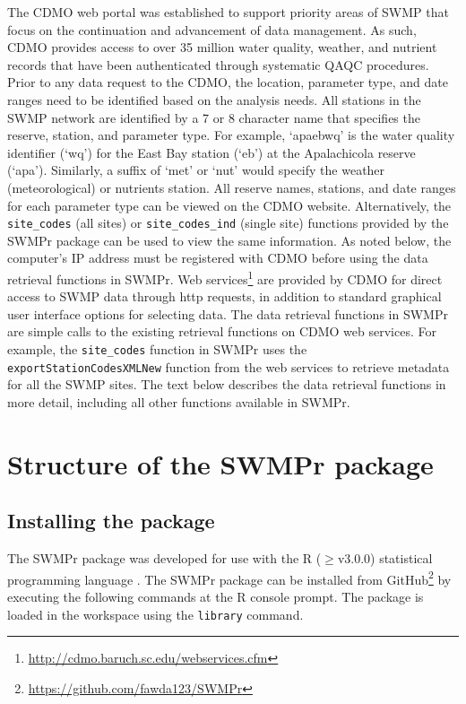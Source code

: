 \documentclass[10pt,letterpaper]{article}\usepackage[]{graphicx}\usepackage[]{color}
\begin{document}
The \ac{CDMO} web portal was established to support priority areas of \ac{SWMP} that focus on the continuation and advancement of data management.  As such, \ac{CDMO} provides access to over 35 million water quality, weather, and nutrient records that have been authenticated through systematic \ac{QAQC} procedures.    Prior to any data request to the \ac{CDMO}, the location, parameter type, and date ranges need to be identified based on the analysis needs. All stations in the \ac{SWMP} network are identified by a 7 or 8 character name that specifies the reserve, station, and parameter type.  For example, `apaebwq' is the water quality identifier (`wq') for the East Bay station (`eb') at the Apalachicola reserve (`apa').  Similarly, a suffix of `met' or `nut' would specify the weather (meteorological) or nutrients station.  All reserve names, stations, and date ranges for each parameter type can be viewed on the \ac{CDMO} website. Alternatively, the \texttt{site\_codes} (all sites) or \texttt{site\_codes\_ind} (single site) functions provided by the SWMPr package can be used to view the same information.  As noted below, the computer's IP address must be registered with \ac{CDMO} before using the data retrieval functions in SWMPr.  Web services\footnote{\url{http://cdmo.baruch.sc.edu/webservices.cfm}} are provided by \ac{CDMO} for direct access to \ac{SWMP} data through http requests, in addition to standard graphical user interface options for selecting data.  The data retrieval functions in SWMPr are simple calls to the existing retrieval functions on \ac{CDMO} web services.  For example, the \texttt{site\_codes} function in SWMPr uses the \texttt{exportStationCodesXMLNew} function from the web services to retrieve metadata for all the \ac{SWMP} sites.  The text below describes the data retrieval functions in more detail, including all other functions available in SWMPr.

\section*{Structure of the SWMPr package}

\subsection*{Installing the package}

The SWMPr package was developed for use with the R ($\geq$v3.0.0) statistical programming language \cite{RDCT14}. The SWMPr package can be installed from GitHub\footnote{\url{https://github.com/fawda123/SWMPr}} by executing the following commands at the R console prompt.  The package is loaded in the workspace using the \texttt{library} command.
\end{document}

